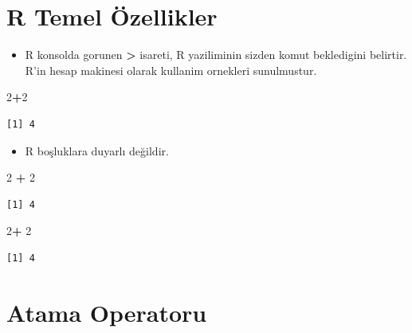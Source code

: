 \documentclass[
  oneside]{book}
\newenvironment{Shaded}{\begin{snugshade}}{\end{snugshade}}
\newcommand{\DecValTok}[1]{\textcolor[rgb]{0.00,0.00,0.81}{#1}}
\newcommand{\SpecialCharTok}[1]{\textcolor[rgb]{0.81,0.36,0.00}{\textbf{#1}}}
\providecommand{\tightlist}{%
  \setlength{\itemsep}{0pt}\setlength{\parskip}{0pt}}
\begin{document}
\hypertarget{r-temel-uxf6zellikler}{%
\section{R Temel Özellikler}\label{r-temel-uxf6zellikler}}

\begin{itemize}
\tightlist
\item
  R konsolda gorunen \textbf{\textgreater{}} isareti, R yaziliminin sizden komut bekledigini belirtir. R'in hesap makinesi olarak kullanim ornekleri sunulmustur.
\end{itemize}

\begin{Shaded}
\begin{Highlighting}[]
\DecValTok{2}\SpecialCharTok{+}\DecValTok{2}
\end{Highlighting}
\end{Shaded}

\begin{verbatim}
[1] 4
\end{verbatim}

\begin{itemize}
\tightlist
\item
  R boşluklara duyarlı değildir.
\end{itemize}

\begin{Shaded}
\begin{Highlighting}[]
\DecValTok{2}  \SpecialCharTok{+}       \DecValTok{2} 
\end{Highlighting}
\end{Shaded}

\begin{verbatim}
[1] 4
\end{verbatim}

\begin{Shaded}
\begin{Highlighting}[]
\DecValTok{2}\SpecialCharTok{+}
  \DecValTok{2}
\end{Highlighting}
\end{Shaded}

\begin{verbatim}
[1] 4
\end{verbatim}

\hypertarget{atama-operatoru}{%
\section{Atama Operatoru}\label{atama-operatoru}}
\end{document}
